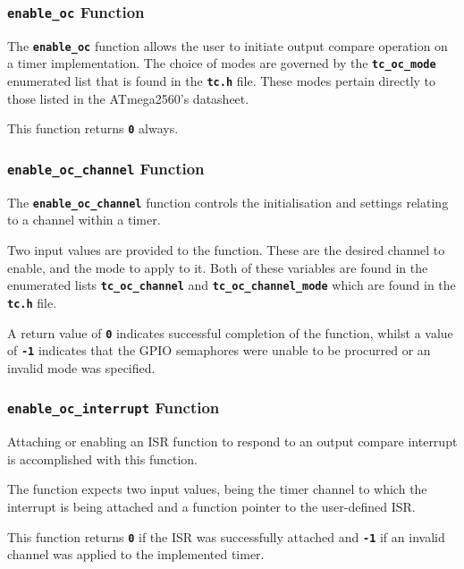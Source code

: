 \documentclass[a4paper, oneside, 11pt, titlepage, onecolumn, openright]{article}
\begin{document}
\subsubsection{\textbf{\texttt{enable\_oc}} Function}
			\label{sss:HALtcenable_ocFunction}
			
 			The \textbf{\texttt{enable\_oc}} function allows the user to initiate output compare operation on a timer implementation. The choice of modes are governed by the \textbf{\texttt{tc\_oc\_mode}} enumerated list that is found in the \textbf{\texttt{tc.h}} file. These modes pertain directly to those listed in the ATmega2560's datasheet.
			
			This function returns \textbf{\texttt{0}} always.

\subsubsection{\textbf{\texttt{enable\_oc\_channel}} Function}
			\label{sss:HALtcenable_oc_channelFunction}
			
			The \textbf{\texttt{enable\_oc\_channel}} function controls the initialisation and settings relating to a channel within a timer. 
						
			Two input values are provided to the function. These are the desired channel to enable, and the mode to apply to it. Both of these variables are found in the enumerated lists \textbf{\texttt{tc\_oc\_channel}} and \textbf{\texttt{tc\_oc\_channel\_mode}} which are found in the \textbf{\texttt{tc.h}} file.
			
			A return value of \textbf{\texttt{0}} indicates successful completion of the function, whilst a value of \textbf{\texttt{-1}} indicates that the GPIO semaphores were unable to be procurred or an invalid mode was specified.
			
\subsubsection{\textbf{\texttt{enable\_oc\_interrupt}} Function}
			\label{sss:HALtcenable_oc_interruptFunction}
			
			Attaching or enabling an ISR function to respond to an output compare interrupt is accomplished with this function.
			
			The function expects two input values, being the timer channel to which the interrupt is being attached and a function pointer to the user-defined ISR.
			
			This function returns \textbf{\texttt{0}} if the ISR was successfully attached and \textbf{\texttt{-1}} if an invalid channel was applied to the implemented timer.
			
\end{document}
